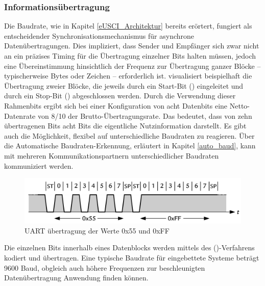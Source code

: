 \subsubsection{Informations\"ubertragung}
\label{UART_uebertragung}

Die Baudrate, wie in Kapitel \ref{eUSCI_Architektur} bereits er\"ortert, fungiert als entscheidender Synchronisationsmechanismus f\"ur asynchrone Daten\"ubertragungen. Dies impliziert, dass Sender und Empf\"anger sich zwar nicht an ein pr\"azises Timing f\"ur die \"Ubertragung einzelner Bits halten m\"ussen, jedoch eine \"Ubereinstimmung hinsichtlich der Frequenz zur \"Ubertragung ganzer Bl\"ocke -- typischerweise Bytes oder Zeichen -- erforderlich ist.  visualisiert beispielhaft die \"Ubertragung zweier Bl\"ocke, die jeweils durch ein Start-Bit () eingeleitet und durch ein Stop-Bit () abgeschlossen werden. Durch die Verwendung dieser Rahmenbits ergibt sich bei einer Konfiguration von acht Datenbits eine Netto-Datenrate von 8/10 der Brutto-\"Ubertragungsrate. Das bedeutet, dass von zehn \"ubertragenen Bits acht Bits die eigentliche Nutzinformation darstellt. Es gibt auch die M\"oglichkeit, flexibel auf unterschiedliche Baudraten zu reagieren. \"Uber die Automatische Baudraten-Erkennung, erl\"autert in Kapitel \ref{auto_baud}, kann mit mehreren Kommunikationspartnern unterschiedlicher Baudraten kommuniziert werden.

\begin{figure}[h!]
	\centering
	\includegraphics[width=1.0\textwidth]{../Bilder/Baudrate.png}
	\caption{UART \"ubertragung der Werte 0x55 und 0xFF\\}
	\label{fig:uart_send}
\end{figure}

Die einzelnen Bits innerhalb eines Datenblocks werden mittels des  ()-Verfahrens kodiert und \"ubertragen. Eine typische Baudrate f\"ur eingebettete Systeme betr\"agt 9600 Baud, obgleich auch h\"ohere Frequenzen zur beschleunigten Daten\"ubertragung Anwendung finden k\"onnen.

